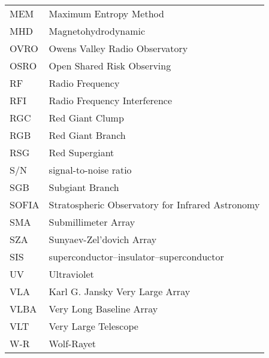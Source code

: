 \begin{center}
\begin{longtable}{ll}
MEM & Maximum Entropy Method\\
MHD & Magnetohydrodynamic \\
OVRO & Owens Valley Radio Observatory \\
OSRO & Open Shared Risk Observing \\
RF & Radio Frequency \\
RFI & Radio Frequency Interference \\
RGC & Red Giant Clump \\
RGB & Red Giant Branch \\
RSG & Red Supergiant \\
S/N & signal-to-noise ratio\\
SGB & Subgiant Branch \\
SOFIA & Stratospheric Observatory for Infrared Astronomy\\
SMA & Submillimeter Array \\
SZA & Sunyaev-Zel'dovich Array \\
SIS & superconductor–insulator–superconductor \\
UV & Ultraviolet \\
VLA & Karl G. Jansky Very Large Array \\
VLBA & Very Long Baseline Array \\
VLT & Very Large Telescope \\
W-R & Wolf-Rayet\\
\end{longtable}
\end{center}

